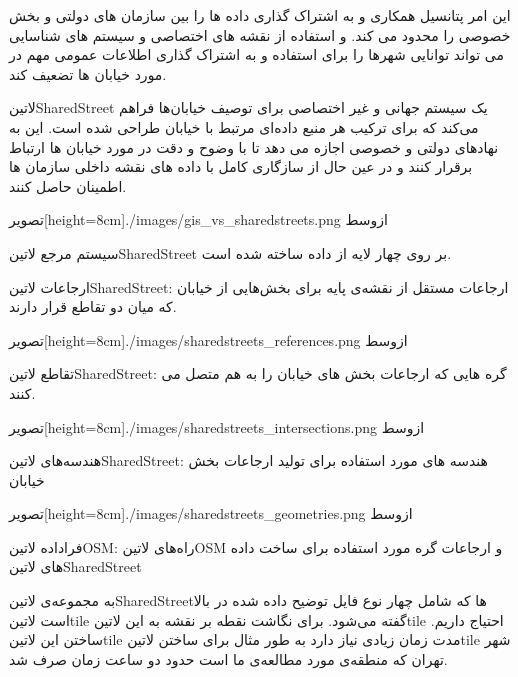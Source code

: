 این امر پتانسیل همکاری و به اشتراک گذاری داده ها را بین سازمان های دولتی و بخش خصوصی را محدود می کند. و استفاده از نقشه های اختصاصی و سیستم های شناسایی می تواند توانایی شهرها را برای استفاده و به اشتراک گذاری اطلاعات عمومی مهم در مورد خیابان ها تضعیف کند.

‌لاتین{SharedStreet} یک سیستم جهانی و غیر اختصاصی برای توصیف خیابان‌ها فراهم می‌کند که برای ترکیب هر منبع داده‌ای مرتبط با خیابان طراحی شده است. این به نهادهای دولتی و خصوصی اجازه می دهد تا با وضوح و دقت در مورد خیابان ها ارتباط برقرار کنند و در عین حال از سازگاری کامل با داده های نقشه داخلی سازمان ها اطمینان حاصل کنند.


  ‌تصویر[height=8cm]{./images/gis_vs_sharedstreets.png}
  ‌ازوسط

 سیستم مرجع ‌لاتین{SharedStreet} بر روی چهار لایه از داده ساخته شده است.


 ارجاعات ‌لاتین{SharedStreet}: ارجاعات مستقل از نقشه‌ی پایه برای بخش‌هایی از خیابان که میان دو تقاطع قرار دارند.


  ‌تصویر[height=8cm]{./images/sharedstreets_references.png}
  ‌ازوسط


 تقاطع ‌لاتین{SharedStreet}: گره هایی که ارجاعات بخش های خیابان را به هم متصل می کنند.


  ‌تصویر[height=8cm]{./images/sharedstreets_intersections.png}
  ‌ازوسط


 هندسه‌های ‌لاتین{SharedStreet}: هندسه های مورد استفاده برای تولید ارجاعات بخش خیابان

  ‌تصویر[height=8cm]{./images/sharedstreets_geometries.png}
  ‌ازوسط


 فراداده ‌لاتین{OSM}: راه‌های ‌لاتین{OSM} و ارجاعات گره مورد استفاده برای ساخت داده های ‌لاتین{SharedStreet}



به مجموعه‌ی ‌لاتین{SharedStreet}ها که شامل چهار نوع فایل توضیح داده شده در بالا است ‌لاتین{tile} گفته می‌شود. برای نگاشت نقطه بر نقشه به این ‌لاتین{tile} احتیاج داریم. ساختن این ‌لاتین{tile} مدت زمان زیادی نیاز دارد به طور مثال برای ساختن ‌لاتین{tile} شهر تهران که منطقه‌ی مورد مطالعه‌ی ما است حدود دو ساعت زمان صرف شد.

